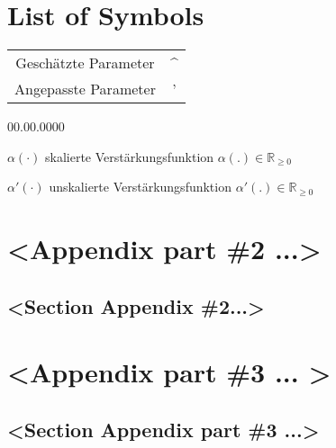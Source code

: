 
\appendix \setcounter{chapter}{0}

\renewcommand{\theequation}{\Alph{chapter}.\arabic{section}.\arabic{equation}}

 \setcounter{equation}{0}


\chapter{\label{cha:Nomenklatur}List of Symbols}

{\small }\begin{tabular}{cc}
{\small Geschätzte Parameter }&
{\small \textasciicircum{}}\tabularnewline
{\small Angepasste Parameter}&
{\small '}\tabularnewline
\end{tabular}{\small \par}

\begin{lyxlist}{00.00.0000}
\item [{{\small $\alpha(\cdot)$}}] {\small skalierte Verstärkungsfunktion
$\alpha(.)\in\mathbb{R}_{\geq0}$}{\small \par}
\begin{singlespace}
\item [{{\small $\alpha'(\cdot)$}}] {\small unskalierte Verstärkungsfunktion
$\alpha'(.)\in\mathbb{R}_{\geq0}$}{\small \par}\end{singlespace}

\end{lyxlist}
\newpage

\mbox{}

\thispagestyle{empty}


\chapter{<Appendix part \#2 ...>}


\section{<Section Appendix \#2...>}

\newpage

\mbox{}

\thispagestyle{empty}


\chapter{<Appendix part \#3 ... >}


\section{<Section Appendix part \#3 ...>}
